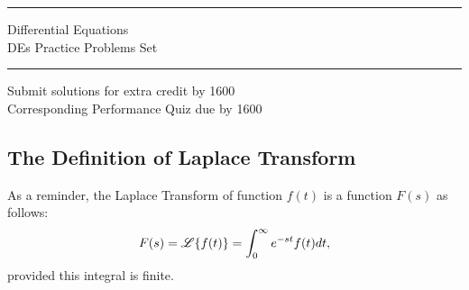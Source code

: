 \pagestyle{empty}

\noindent\rule{7in}{0.4pt}
\begin{center}
{\sc
\noindent Differential Equations\\
 DEs Practice Problems Set \DEPPSetNum\        %
}
\end{center}
\noindent\rule{7in}{0.4pt}

\noindent Submit solutions for extra credit by 1600 \ECDueDate\\
\noindent Corresponding Performance Quiz due by 1600 \PQDueDate\\

\vspace{0.5cm}

\subsection*{The Definition of Laplace Transform}

\noindent  As a reminder, the Laplace Transform of function $f(t)$ is a function $F(s)$ as follows:
 \[ F(s) = \mathscr{L}\{ f(t) \} = \int_0^{\infty}e^{-st}f(t) dt, \]
 provided this integral is finite.\\

